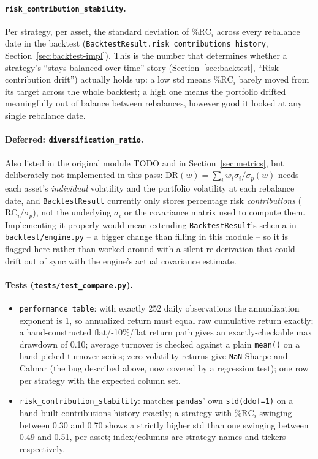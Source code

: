 \documentclass[11pt]{article}
\begin{document}
\paragraph{\texttt{risk\_contribution\_stability}.} Per strategy, per
asset, the standard deviation of $\%\text{RC}_i$ across every rebalance
date in the backtest (\texttt{BacktestResult.risk\_contributions\_history},
Section~\ref{sec:backtest-impl}). This is the number that determines
whether a strategy's ``stays balanced over time'' story
(Section~\ref{sec:backtest}, ``Risk-contribution drift'') actually
holds up: a low std means $\%\text{RC}_i$ barely moved from its target
across the whole backtest; a high one means the portfolio drifted
meaningfully out of balance between rebalances, however good it looked
at any single rebalance date.

\paragraph{Deferred: \texttt{diversification\_ratio}.} Also listed in
the original module TODO and in Section~\ref{sec:metrics}, but
deliberately not implemented in this pass: $\text{DR}(w) = \sum_i w_i
\sigma_i / \sigma_p(w)$ needs each asset's \emph{individual} volatility
and the portfolio volatility at each rebalance date, and
\texttt{BacktestResult} currently only stores percentage risk
\emph{contributions} ($\text{RC}_i/\sigma_p$), not the underlying
$\sigma_i$ or the covariance matrix used to compute them. Implementing
it properly would mean extending \texttt{BacktestResult}'s schema in
\texttt{backtest/engine.py} -- a bigger change than filling in this
module -- so it is flagged here rather than worked around with a silent
re-derivation that could drift out of sync with the engine's actual
covariance estimate.

\paragraph{Tests (\texttt{tests/test\_compare.py}).}
\begin{itemize}
    \item \texttt{performance\_table}: with exactly 252 daily
    observations the annualization exponent is 1, so annualized return
    must equal raw cumulative return exactly; a hand-constructed
    flat/-10\%/flat return path gives an exactly-checkable max drawdown
    of 0.10; average turnover is checked against a plain \texttt{mean()}
    on a hand-picked turnover series; zero-volatility returns give
    \texttt{NaN} Sharpe and Calmar (the bug described above, now
    covered by a regression test); one row per strategy with the
    expected column set.
    \item \texttt{risk\_contribution\_stability}: matches
    \texttt{pandas}' own \texttt{std(ddof=1)} on a hand-built
    contributions history exactly; a strategy with $\%\text{RC}_i$
    swinging between 0.30 and 0.70 shows a strictly higher std than one
    swinging between 0.49 and 0.51, per asset; index/columns are
    strategy names and tickers respectively.
\end{itemize}
\end{document}
